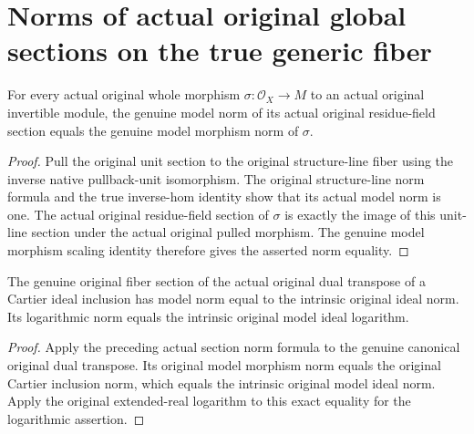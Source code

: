 \section{Norms of actual original global sections on the true generic fiber}

\begin{lemma}
\label{lem:actual-line-fiber-section-model-norm}
\leanok
{}
For every actual original whole morphism
$\sigma:\mathcal O_X\to M$ to an actual original invertible
module, the genuine model norm of its actual original residue-field
section equals the genuine model morphism norm of $\sigma$.
\end{lemma}
\begin{proof}
Pull the original unit section to the original structure-line
fiber using the inverse native pullback-unit isomorphism. The
original structure-line norm formula and the true inverse-hom
identity show that its actual model norm is one. The actual
original residue-field section of $\sigma$ is exactly the image
of this unit-line section under the actual original pulled
morphism. The genuine model morphism scaling identity therefore
gives the asserted norm equality.
\end{proof}

\begin{corollary}
\label{cor:actual-dual-cartier-fiber-section-model-potential}
\leanok
{}
The genuine original fiber section of the actual original dual
transpose of a Cartier ideal inclusion has model norm equal to
the intrinsic original ideal norm. Its logarithmic norm equals the
intrinsic original model ideal logarithm.
\end{corollary}
\begin{proof}
Apply the preceding actual section norm formula to the genuine
canonical original dual transpose. Its original model morphism
norm equals the original Cartier inclusion norm, which equals the
intrinsic original model ideal norm. Apply the original extended-real
logarithm to this exact equality for the logarithmic assertion.
\end{proof}
